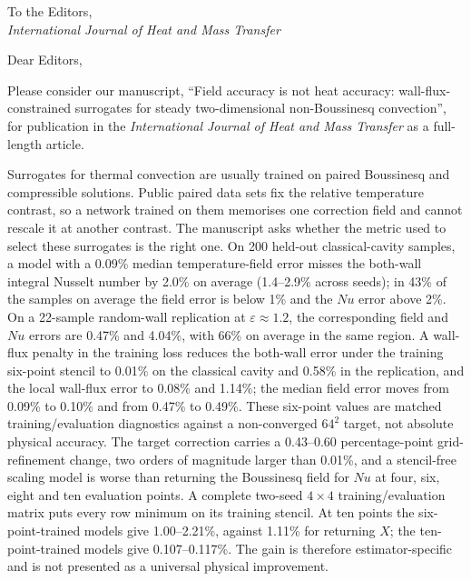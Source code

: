 \documentclass[11pt]{article}
\begin{document}
\noindent
To the Editors,\\
\emph{International Journal of Heat and Mass Transfer}

\vspace{8pt}
\noindent
Dear Editors,

\noindent
Please consider our manuscript, ``Field accuracy is not heat accuracy:
wall-flux-constrained surrogates for steady two-dimensional non-Boussinesq convection'', for
publication in the
\emph{International Journal of Heat and Mass Transfer} as a full-length article.

Surrogates for thermal convection are usually trained on paired Boussinesq and compressible
solutions. Public paired data sets fix the relative temperature contrast, so a network trained
on them memorises one correction field and cannot rescale it at another contrast. The
manuscript asks whether the metric used to select these surrogates is the right one. On 200
held-out classical-cavity samples, a model with a 0.09\% median temperature-field error misses the
both-wall integral Nusselt number by 2.0\% on average (1.4--2.9\% across seeds); in 43\% of the
samples on average the field error is below 1\% and the $Nu$ error above 2\%. On a 22-sample
random-wall replication at $\varepsilon\approx1.2$, the corresponding field and $Nu$ errors are
0.47\% and 4.04\%, with 66\% on average in the same region. A wall-flux penalty in the training
loss reduces the both-wall error under the training six-point stencil to 0.01\% on the classical
cavity and 0.58\% in the replication, and the local wall-flux error to 0.08\% and 1.14\%; the
median field error moves from 0.09\% to 0.10\% and from 0.47\% to 0.49\%.
These six-point values are matched training/evaluation diagnostics against a non-converged
$64^2$ target, not absolute physical accuracy. The target correction carries a 0.43--0.60
percentage-point grid-refinement change, two orders of magnitude larger than 0.01\%, and a
stencil-free scaling model is worse than returning the Boussinesq field for $Nu$ at four, six,
eight and ten evaluation points. A complete two-seed $4\times4$ training/evaluation matrix
puts every row minimum on its training stencil. At ten points the six-point-trained models
give 1.00--2.21\%, against 1.11\% for returning $X$; the ten-point-trained models give
0.107--0.117\%. The gain is therefore estimator-specific and is not presented as a universal
physical improvement.
\end{document}
